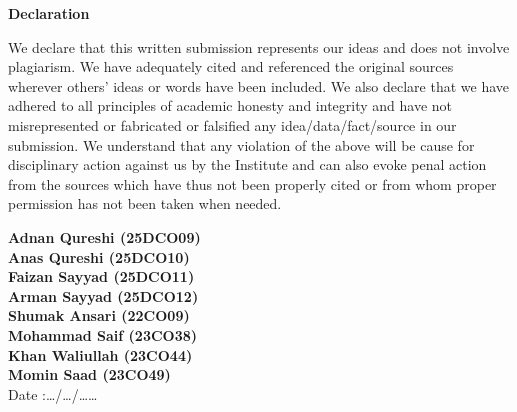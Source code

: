 \begin{center}
\thispagestyle{empty}
\LARGE{\textbf{Declaration}}\\[1cm]
\end{center}

We declare that this written submission represents our ideas and does not involve plagiarism. We have adequately cited and referenced the original sources wherever others’ ideas or words have been included. We also declare that we have adhered to all principles of academic honesty and integrity and have not misrepresented or fabricated or falsified any idea/data/fact/source in our submission. We understand that any violation of the above will be cause for disciplinary action against us by the Institute and can also evoke penal action from the sources which have thus not been properly cited or from whom proper permission has not been taken when needed. 

\vspace{0.8cm}
\noindent
\large{\textbf{Adnan Qureshi (25DCO09)}} \\ 
\hspace{0.1cm}\large{\textbf{Anas Qureshi (25DCO10)}} \\ 
\hspace{0.1cm}\large{\textbf{Faizan Sayyad (25DCO11)}} \\ 
\hspace{0.1cm}\large{\textbf{Arman Sayyad (25DCO12)}} \\
\hspace{0.1cm}\large{\textbf{Shumak Ansari (22CO09)}} \\ 
\hspace{0.1cm}\large{\textbf{Mohammad Saif (23CO38)}} \\ 
\hspace{0.1cm}\large{\textbf{Khan Waliullah (23CO44)}} \\ 
\hspace{0.1cm}\large{\textbf{Momin Saad (23CO49)}} \\

\vspace{4.5cm}
Date :\hspace{0.2cm}\ldots/\ldots/\ldots\ldots
